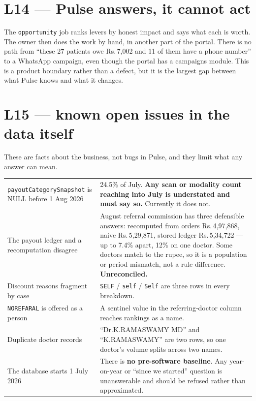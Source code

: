 \documentclass[11pt,a4paper]{report}
\newcommand{\rs}[1]{Rs.\,#1}
\newcommand{\code}[1]{\texttt{\small #1}}
\begin{document}
\section{L14 --- Pulse answers, it cannot act}

The \code{opportunity} job ranks levers by honest impact and says what each is worth. The owner then
does the work by hand, in another part of the portal. There is no path from ``these 27 patients owe
\rs{7{,}002} and 11 of them have a phone number'' to a WhatsApp campaign, even though the portal has
a campaigns module. This is a product boundary rather than a defect, but it is the largest gap
between what Pulse knows and what it changes.

\section{L15 --- known open issues in the data itself}

These are facts about the business, not bugs in Pulse, and they limit what any answer can mean.

\begin{center}
\small
\begin{tabular}{@{}p{5.0cm}p{9.8cm}@{}}
\toprule
\code{payoutCategorySnapshot} is NULL before 1 Aug 2026 & 24.5\% of July. \textbf{Any scan or
 modality count reaching into July is understated and must say so.} Currently it does not.\\
The payout ledger and a recomputation disagree & August referral commission has three defensible
 answers: recomputed from orders \rs{4{,}97{,}868}, naive \rs{5{,}29{,}871}, stored ledger
 \rs{5{,}34{,}722} --- up to 7.4\% apart, 12\% on one doctor. Some doctors match to the rupee, so it
 is a population or period mismatch, not a rule difference. \textbf{Unreconciled.}\\
Discount reasons fragment by case & \code{SELF} / \code{self} / \code{Self} are three rows in every
 breakdown.\\
\code{NOREFARAL} is offered as a person & A sentinel value in the referring-doctor column reaches
 rankings as a name.\\
Duplicate doctor records & ``Dr.K.RAMASWAMY MD'' and ``K.RAMASWAMY'' are two rows, so one doctor's
 volume splits across two names.\\
The database starts 1 July 2026 & There is \textbf{no pre-software baseline}. Any year-on-year or
 ``since we started'' question is unanswerable and should be refused rather than approximated.\\
\bottomrule
\end{tabular}
\end{center}
\end{document}
